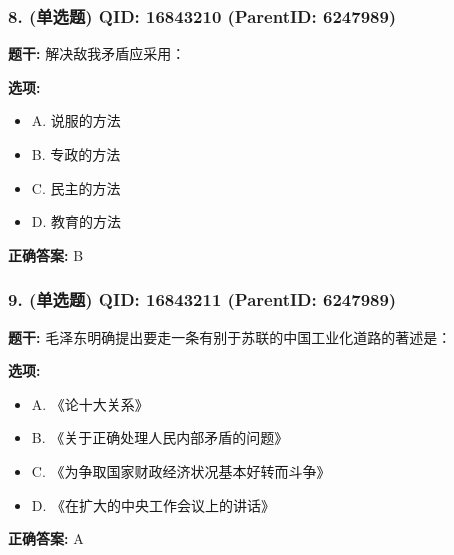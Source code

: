\documentclass[12pt,UTF8]{ctexart}
\begin{document}
\subsubsection*{8. (单选题) \small QID: 16843210 (ParentID: 6247989)}

\textbf{题干:}
解决敌我矛盾应采用：



\textbf{选项:}
\begin{itemize}[leftmargin=*]

  \item A. 说服的方法

  \item B. 专政的方法

  \item C. 民主的方法

  \item D. 教育的方法

\end{itemize}

\textbf{正确答案:}
B

\vspace{0.3em}\hrulefill\vspace{0.7em}

\subsubsection*{9. (单选题) \small QID: 16843211 (ParentID: 6247989)}

\textbf{题干:}
毛泽东明确提出要走一条有别于苏联的中国工业化道路的著述是：



\textbf{选项:}
\begin{itemize}[leftmargin=*]

  \item A. 《论十大关系》

  \item B. 《关于正确处理人民内部矛盾的问题》

  \item C. 《为争取国家财政经济状况基本好转而斗争》

  \item D. 《在扩大的中央工作会议上的讲话》

\end{itemize}

\textbf{正确答案:}
A

\vspace{0.3em}\hrulefill\vspace{0.7em}
\end{document}

